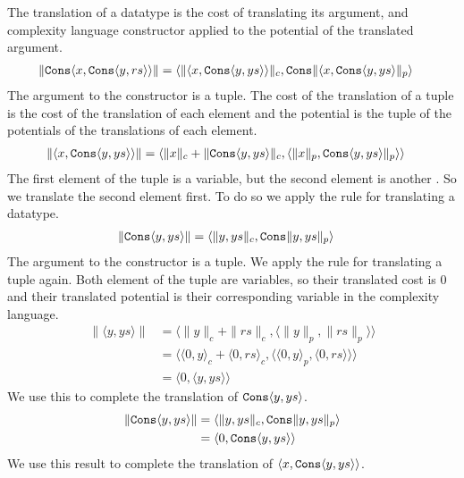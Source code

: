 The translation of a datatype is the cost of translating its argument, and
complexity language constructor applied to the potential of the translated
argument.
%
\begin{align*}
  \|\texttt{Cons}\langle x,\texttt{Cons}\langle y, rs \rangle\rangle\| &= \langle \|\langle x, \texttt{Cons} \langle y,ys\rangle\rangle\|_c, \texttt{Cons}\|\langle x, \texttt{Cons}\langle y,ys\rangle\|_p\rangle
\end{align*}
%
The argument to the  constructor is a tuple. The cost of the
translation of a tuple is the cost of the translation of each element and the
potential is the tuple of the potentials of the translations of each element.
%
\begin{align*}
  \|\langle x, \texttt{Cons}\langle y,ys\rangle\rangle\| &= \langle \|x\|_c + \|\texttt{Cons}\langle y,ys\rangle\|_c, \langle \|x\|_p,\texttt{Cons}\langle y,ys\rangle\|_p\rangle\rangle
\end{align*}
%
The first element of the tuple is a variable, but the second element is another
. So we translate the second element first. To do so we apply the rule
for translating a datatype.
%
\begin{align*}
  \|\texttt{Cons}\langle y,ys\rangle\| &= \langle \|y,ys\|_c, \texttt{Cons}\|y,ys\|_p\rangle
\end{align*}
%
The argument to the constructor is a tuple. We apply the rule for translating a
tuple again. Both element of the tuple are variables, so their translated cost
is $0$ and their translated potential is their corresponding variable in the
complexity language.
%
\begin{align*}
  \|\langle y,ys\rangle\| &= \langle \|y\|_c + \|rs\|_c, \langle\|y\|_p,\|rs\|_p\rangle\rangle \\
                         &= \langle \langle 0,y\rangle_c + \langle 0, rs\rangle_c, \langle \langle0,y\rangle_p, \langle 0,rs\rangle\rangle\rangle \\
                         &= \langle 0, \langle y,ys\rangle\rangle
\end{align*}
%
We use this to complete the translation of $\texttt{Cons}\langle y,ys\rangle$.
%
\begin{align*}
  \|\texttt{Cons}\langle y,ys\rangle\| &= \langle \|y,ys\|_c, \texttt{Cons}\|y,ys\|_p\rangle \\
                                  &= \langle 0, \texttt{Cons}\langle y,ys\rangle\rangle
\end{align*}
%
We use this result to complete the translation of $\langle x,\texttt{Cons}\langle y,ys\rangle\rangle$.
